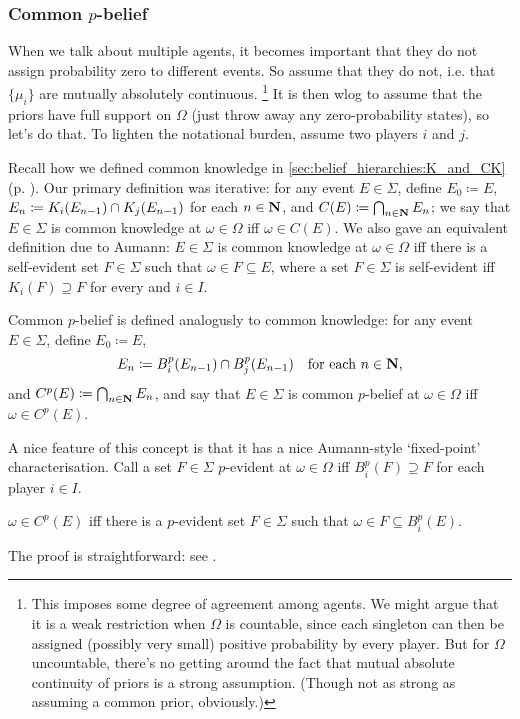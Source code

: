 \documentclass[11pt,letterpaper,reqno,oneside]{article}
\begin{document}
\subsubsection{Common \texorpdfstring{$p$}{p}-belief}
\label{sec:robustness:common_p-belief:common_p_belief}

When we talk about multiple agents, it becomes important that they do not assign probability zero to different events. So assume that they do not, i.e. that $\{ \mu_i \}$ are mutually absolutely continuous.%
	\footnote{This imposes some degree of agreement among agents. We might argue that it is a weak restriction when $\Omega$ is countable, since each singleton can then be assigned (possibly very small) positive probability by every player. But for $\Omega$ uncountable, there's no getting around the fact that mutual absolute continuity of priors is a strong assumption. (Though not as strong as assuming a common prior, obviously.)}
It is then wlog to assume that the priors have full support on $\Omega$ (just throw away any zero-probability states), so let's do that. To lighten the notational burden, assume two players $i$ and $j$.

Recall how we defined common knowledge in \cref{sec:belief_hierarchies:K_and_CK} (p. \pageref{sec:belief_hierarchies:K_and_CK}). Our primary definition was iterative: for any event $E \in \Sigma$, define $E_0 \coloneqq E$, $E_n \coloneqq K_i(E_{n-1}) \cap K_j(E_{n-1})$ for each $n \in \mathbf{N}$, and $C(E) \coloneqq \bigcap_{n \in \mathbf{N}} E_n$; we say that $E \in \Sigma$ is common knowledge at $\omega \in \Omega$ iff $\omega \in C(E)$. We also gave an equivalent definition due to Aumann: $E \in \Sigma$ is common knowledge at $\omega \in \Omega$ iff there is a self-evident set $F \in \Sigma$ such that $\omega \in F \subseteq E$, where a set $F \in \Sigma$ is self-evident iff $K_i(F) \supseteq F$ for every and $i \in I$.

Common $p$-belief is defined analogusly to common knowledge: for any event $E \in \Sigma$, define $E_0 \coloneqq E$,
%
\begin{equation*}
	E_n \coloneqq B^p_i(E_{n-1}) \cap B^p_j(E_{n-1})
	\quad\text{for each $n \in \mathbf{N}$} ,
\end{equation*}
%
and $C^p(E) \coloneqq \bigcap_{n \in \mathbf{N}} E_n$, and say that $E \in \Sigma$ is common $p$-belief at $\omega \in \Omega$ iff $\omega \in C^p(E)$.

A nice feature of this concept is that it has a nice Aumann-style `fixed-point' characterisation. Call a set $F \in \Sigma$ $p$-evident at $\omega \in \Omega$ iff $B^p_i(F) \supseteq F$ for each player $i \in I$.
%
\begin{proposition}
	\label{proposition:MS_Cp_iterative_fp}
	$\omega \in C^p(E)$ iff there is a $p$-evident set $F \in \Sigma$ such that $\omega \in F \subseteq B^p_i(E)$.
\end{proposition}
%
\noindent The proof is straightforward: see \textcite[][p. 177--8]{MondererSamet1989}.
\end{document}
